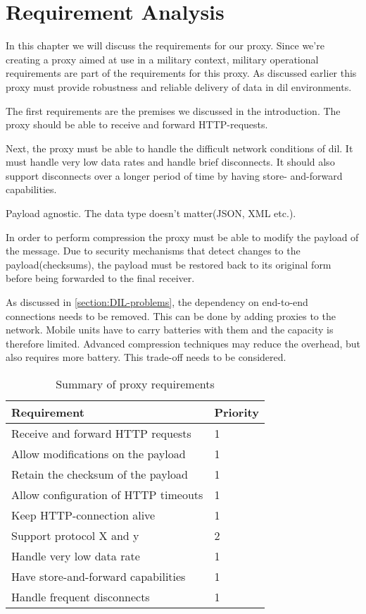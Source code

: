 \chapter{Requirement Analysis}

In this chapter we will discuss the requirements for our proxy. Since we're
creating a proxy aimed at use in a military context, military operational
requirements are part of the requirements for this proxy. As discussed earlier
this proxy must provide robustness and reliable delivery of data in \gls{dil}
environments.

The first requirements are the premises we discussed in the introduction. The
proxy should be able to receive and forward HTTP-requests.

Next, the proxy must be able to handle the difficult network conditions of
dil. It must handle very low data rates and handle brief disconnects. It
should also support disconnects over a longer period of time by having store-
and-forward capabilities.

Payload agnostic. The data type doesn't matter(JSON, XML etc.).

In order to perform compression the proxy must be able to modify the payload
of the message. Due to security mechanisms that detect changes to the
payload(checksums), the payload must be restored back to its original form
before being forwarded to the final receiver.

As discussed in \cref{section:DIL-problems}, the dependency on end-to-end
connections needs to be removed. This can be done by adding proxies to the
network. Mobile units have to carry batteries with them and the capacity is
therefore limited. Advanced compression techniques may reduce the overhead,
but also requires more battery. This trade-off needs to be considered.


\begin{table}[h]
\begin{tabular}{| l | l |}
\hline
  \textbf{Requirement} & \textbf{Priority} \\ \hline
  Receive and forward HTTP requests & 1\\ \hline
  Allow modifications on the payload & 1 \\ \hline
  Retain the checksum of the payload & 1 \\ \hline
  Allow configuration of HTTP timeouts & 1 \\ \hline
  Keep HTTP-connection alive & 1 \\ \hline
  Support protocol X and y & 2 \\ \hline
  Handle very low data rate & 1 \\ \hline
  Have store-and-forward capabilities & 1 \\ \hline
  Handle frequent disconnects & 1\\ \hline
\end{tabular}
\caption{Summary of proxy requirements}
\end{table}


